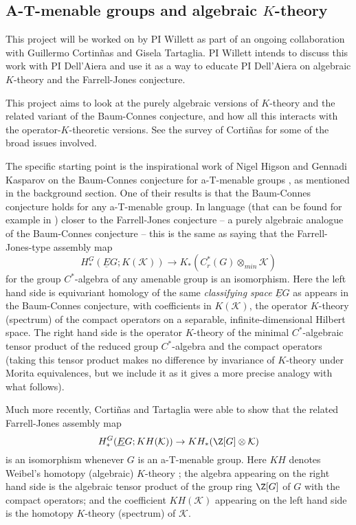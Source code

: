 %
%



\subsection{A-T-menable groups and algebraic $K$-theory}\label{atmen}



This project will be worked on by PI Willett as part of an ongoing collaboration with Guillermo Cortin\~{n}as and Gisela Tartaglia.  PI Willett intends to discuss this work with PI Dell'Aiera and use it as a way to educate PI Dell'Aiera on algebraic $K$-theory and the Farrell-Jones conjecture.

This project aims to look at the purely algebraic versions of $K$-theory and the related variant of the Baum-Connes conjecture, and how all this interacts with the operator-$K$-theoretic versions.  See the survey \cite{Cortinas:2008aa} of Corti\~{n}as for some of the broad issues involved.

The specific starting point is the inspirational work of Nigel Higson and Gennadi Kasparov on the Baum-Connes conjecture for a-T-menable groups \cite{Higson:2001eb}, as mentioned in the background section.  One of their results is that the Baum-Connes conjecture holds for any a-T-menable group.  In language (that can be found for example in \cite{Davis:1998qf}) closer to the Farrell-Jones conjecture -- a purely algebraic analogue of the Baum-Connes conjecture -- this is the same as saying that the Farrell-Jones-type assembly map
 $$
 H^G_*(\underline{E}G;K(\mathcal{K})) \to K_*(C^*_r(G)\otimes_{min} \mathcal{K})
 $$
for the group $C^*$-algebra of any amenable group is an isomorphism.  Here the left hand side is equivariant homology of the same \emph{classifying space} $\underline{E}G$ as appears in the Baum-Connes conjecture, with coefficients in $K(\mathcal{K})$,  the operator $K$-theory (spectrum) of the compact operators on a separable, infinite-dimensional Hilbert space.  The right hand side is the operator $K$-theory of the minimal $C^*$-algebraic tensor product of the reduced group $C^*$-algebra and the compact operators (taking this tensor product makes no difference by invariance of $K$-theory under Morita equivalences, but we include it as it gives a more precise analogy with what follows).
 
 Much more recently, Corti\~{n}as and Tartaglia were able to show that the related Farrell-Jones assembly map 
 \begin{equation}\label{k iso}
 H^G_*(\underline{E}G;KH(\mathcal{K})) \to KH_*(\Z[G]\otimes \mathcal{K})
 \end{equation}
is an isomorphism whenever $G$ is an a-T-menable group.  Here $KH$ denotes Weibel's homotopy (algebraic) $K$-theory \cite[Section IV.12]{Weibel:2013bf}; the algebra appearing on the right hand side is the algebraic tensor product of the group ring $\Z[G]$ of $G$ with the compact operators; and the coefficient $KH(\mathcal{K})$ appearing on the left hand side is the homotopy $K$-theory (spectrum) of $\mathcal{K}$.  
 
